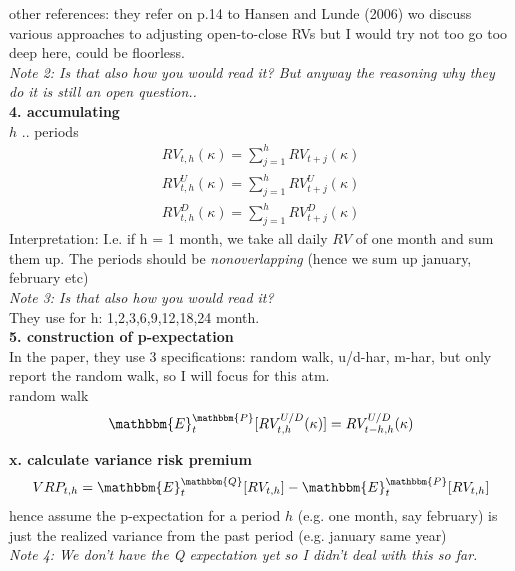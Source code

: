 \documentclass{article}
\begin{document}
other references: they refer on p.14 to Hansen and Lunde (2006) wo discuss various approaches to adjusting open-to-close RVs but I would try not too go too deep here, could be floorless.\\

\textit{Note 2: Is that also how you would read it? But anyway the reasoning why they do it is still an open question..}\\

\textbf{4. accumulating}\\

$h$ .. periods
\begin{align*}
RV_{t,h}(\kappa) = \sum_{j=1}^{h} RV_{t+j}(\kappa)\\
RV_{t,h}^{U}(\kappa) = \sum_{j=1}^{h} RV_{t+j}^{U}(\kappa)\\
RV_{t,h}^{D}(\kappa) = \sum_{j=1}^{h} RV_{t+j}^{D}(\kappa)
\end{align*}
Interpretation: I.e. if h = 1 month, we take all daily $RV$ of one month and sum them up. The periods should be \textit{nonoverlapping} (hence we sum up january, february etc)\\

\textit{Note 3: Is that also how you would read it?}\\

They use for h: 1,2,3,6,9,12,18,24 month.\\

\textbf{5. construction of p-expectation}\\

In the paper, they use 3 specifications: random walk, u/d-har, m-har, but only report the random walk, so I will focus for this atm.\\

random walk
\begin{align*}
\mathbbm{E}_{t}^{\mathbbm{P}}[RV_{t,h}^{U/D}(\kappa)] = RV_{t-h,h}^{U/D}(\kappa)
\end{align*}

\textbf{x. calculate variance risk premium}\\
\begin{align*}
VRP_{t,h} = \mathbbm{E}_{t}^{\mathbbm{Q}}[RV_{t,h}] - \mathbbm{E}_{t}^{\mathbbm{P}}[RV_{t,h}]
\end{align*}
hence assume the p-expectation for a period $h$ (e.g. one month, say february) is just the realized variance from the past period (e.g. january same year)\\

\textit{Note 4: We don't have the Q expectation yet so I didn't deal with this so far.}\\
\end{document}
